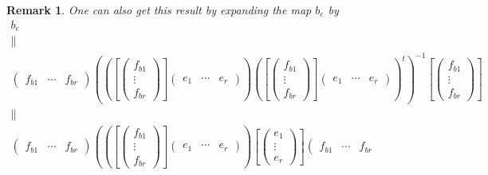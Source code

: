 \documentclass[aps,preprint]{revtex4}
\newtheorem{remark}[theorem]{Remark}
\begin{document}
\begin{remark}
One can also get this result by expanding the map $b_{e}$ by 
\begin{gather}
b_{e} \\
\parallel \\
\left( 
\begin{array}{ccc}
f_{b1} & \cdots & f_{br}%
\end{array}%
\right) \left( \left( \left[ \left( 
\begin{array}{c}
f_{b1} \\ 
\vdots \\ 
f_{br}%
\end{array}%
\right) \right] \left( 
\begin{array}{ccc}
e_{1} & \cdots & e_{r}%
\end{array}%
\right) \right) \left( \left[ \left( 
\begin{array}{c}
f_{b1} \\ 
\vdots \\ 
f_{br}%
\end{array}%
\right) \right] \left( 
\begin{array}{ccc}
e_{1} & \cdots & e_{r}%
\end{array}%
\right) \right) ^{t}\right) ^{-1}\left[ \left( 
\begin{array}{c}
f_{b1} \\ 
\vdots \\ 
f_{br}%
\end{array}%
\right) \right] \\
\parallel \\
\left( 
\begin{array}{ccc}
f_{b1} & \cdots & f_{br}%
\end{array}%
\right) \left( \left( \left[ \left( 
\begin{array}{c}
f_{b1} \\ 
\vdots \\ 
f_{br}%
\end{array}%
\right) \right] \left( 
\begin{array}{ccc}
e_{1} & \cdots & e_{r}%
\end{array}%
\right) \right) \left[ \left( 
\begin{array}{c}
e_{1} \\ 
\vdots \\ 
e_{r}%
\end{array}%
\right) \right] \left( 
\begin{array}{ccc}
f_{b1} & \cdots & f_{br}%
\end{array}%

\end{gather}
\end{remark}
\end{document}
